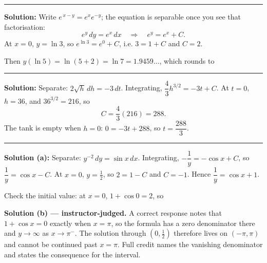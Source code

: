 \documentclass[12pt]{article}
\begin{document}
\vspace{0.2cm}\noindent\rule{\linewidth}{0.2pt}\vspace{0.2cm}


\textbf{Solution:} Write $e^{\,x-y} = e^x e^{-y}$; the equation is separable once you see that factorisation:
\[ e^{y}\,dy = e^{x}\,dx \quad\Longrightarrow\quad e^{y} = e^{x} + C. \]
At $x = 0$, $y = \ln 3$, so $e^{\ln 3} = e^{0} + C$, i.e. $3 = 1 + C$ and $C = 2$. 

Then $y(\ln 5) = \ln(5 + 2) = \ln 7 = 1.9459\ldots$, which rounds to 

\vspace{0.2cm}\noindent\rule{\linewidth}{0.2pt}\vspace{0.2cm}


\textbf{Solution:} Separate: $2\sqrt{h}\,dh = -3\,dt$. Integrating, $\dfrac{4}{3}h^{3/2} = -3t + C$. At $t = 0$, $h = 36$, and $36^{3/2} = 216$, so
\[ C = \frac{4}{3}(216) = 288. \]
The tank is empty when $h = 0$: \; $0 = -3t + 288$, so $t = \dfrac{288}{3}$. 

\vspace{0.2cm}\noindent\rule{\linewidth}{0.2pt}\vspace{0.2cm}


\textbf{Solution (a):} Separate: $y^{-2}\,dy = \sin x\,dx$. Integrating, $-\dfrac{1}{y} = -\cos x + C$, so $\dfrac{1}{y} = \cos x - C$. At $x = 0$, $y = \frac{1}{2}$, so $2 = 1 - C$ and $C = -1$. Hence $\dfrac{1}{y} = \cos x + 1$. 

Check the initial value: at $x = 0$, $1 + \cos 0 = 2$, so 

\textbf{Solution (b) --- instructor-judged.} A correct response notes that $1 + \cos x = 0$ exactly when $x = \pi$, so the formula has a zero denominator there and $y \to \infty$ as $x \to \pi^{-}$. The solution through $(0, \frac{1}{2})$ therefore lives on $(-\pi, \pi)$ and cannot be continued past $x = \pi$. Full credit names the vanishing denominator and states the consequence for the interval.
\end{document}
